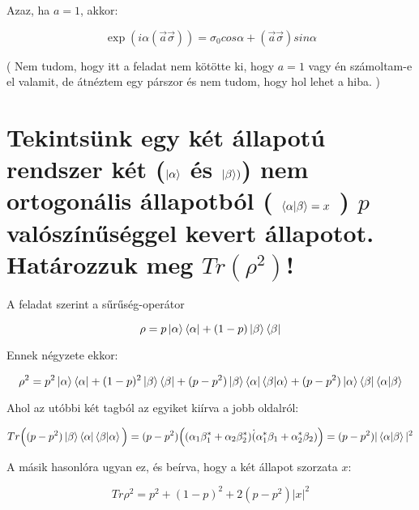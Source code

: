 \documentclass[a4paper,12pt]{article}
\begin{document}
\par Azaz, ha $a = 1$, akkor:

\begin{equation}
\exp(i\alpha(\vec{a}\vec{\sigma})) = \sigma_0 cos\alpha + (\vec{a}\vec{\sigma}) sin\alpha
\end{equation}

\par ( Nem tudom, hogy itt a feladat nem kötötte ki, hogy $a = 1$ vagy én számoltam-e el valamit, de átnéztem egy párszor és nem tudom, hogy hol lehet a hiba. )

\section{Tekintsünk egy két állapotú rendszer két ($\ket{\alpha}$ és $\ket{\beta})$) nem ortogonális állapotból ( $\bra{\alpha}\ket{\beta} = x$ ) $p$ valószínűséggel kevert állapotot. Határozzuk meg $Tr(\rho^{2})$!}

\par A feladat szerint a sűrűség-operátor

\begin{equation*}
\rho = p\ket{\alpha}\bra{\alpha} + (1-p)\ket{\beta}\bra{\beta}
\end{equation*}

\par Ennek négyzete ekkor:

\begin{equation*}
\rho^{2} = p^{2}\ket{\alpha}\bra{\alpha} + (1-p)^{2}\ket{\beta}\bra{\beta} + (p - p^{2})\ket{\beta}\bra{\alpha}\bra{\beta}\ket{\alpha} + (p - p^{2})\ket{\alpha}\bra{\beta}\bra{\alpha}\ket{\beta}
\end{equation*}

\par Ahol az utóbbi két tagból az egyiket kiírva a jobb oldalról:

\begin{equation*}
Tr\Big((p - p^{2})\ket{\beta}\bra{\alpha}\bra{\beta}\ket{\alpha}\Big) = (p - p^{2})\Big( (\alpha_1 \beta_1^{*} + \alpha_2 \beta_{2}^{*})\dot(\alpha_{1}^{*}\beta_1 + \alpha_{2}^{*}\beta_{2})\Big) = (p - p^{2})|\bra{\alpha}\ket{\beta}|^{2}
\end{equation*}

\par A másik hasonlóra ugyan ez, és beírva, hogy a két állapot szorzata $x$:

\begin{equation*}
Tr\rho^{2} = p^{2}+ (1-p)^{2} + 2(p - p^{2})|x|^{2}
\end{equation*}
\end{document}

